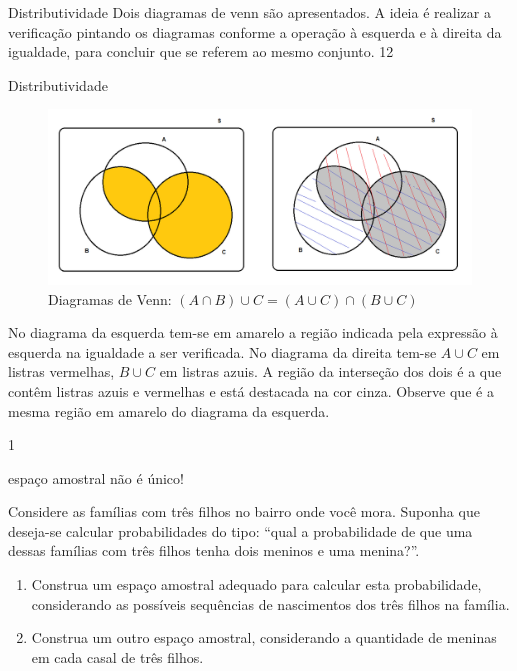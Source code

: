 \begin{sugestions}{Distributividade}
{
Dois diagramas de venn são apresentados. A ideia é realizar a verificação pintando os diagramas conforme a operação à esquerda e à direita da igualdade, para concluir que se referem ao mesmo conjunto.
}{1}{2}
\end{sugestions}
\begin{answer}{Distributividade}
{
\begin{figure}[H]
\centering

\includegraphics[width=\linewidth]{distributividade.png}
\caption{Diagramas de Venn: $(A\cap B)\cup C=(A\cup C)\cap(B\cup C)$}
\label{}
\end{figure}

No diagrama da esquerda tem-se em amarelo a região indicada pela expressão à esquerda na igualdade a ser verificada. No diagrama da direita tem-se $A\cup C$ em listras vermelhas, $B\cup C$ em listras azuis. A região da interseção dos dois é a que contêm listras azuis e vermelhas e está destacada na cor cinza. Observe que é a mesma região em amarelo do diagrama da esquerda.
}{1}
\end{answer}
\begin{task}{espaço amostral não é único!}
\label{espaço-nao-unico}


Considere as famílias com três filhos no bairro onde você mora. Suponha que deseja-se calcular probabilidades do tipo: “qual a probabilidade de que uma dessas famílias com três filhos tenha dois meninos e uma menina?”.
\begin{enumerate}
\item {} 
Construa um espaço amostral adequado para calcular esta probabilidade, considerando as possíveis sequências de nascimentos dos três filhos na família.

\item {} 
Construa um outro espaço amostral, considerando a quantidade de meninas em cada casal de três filhos.

\end{enumerate}
\end{task}

